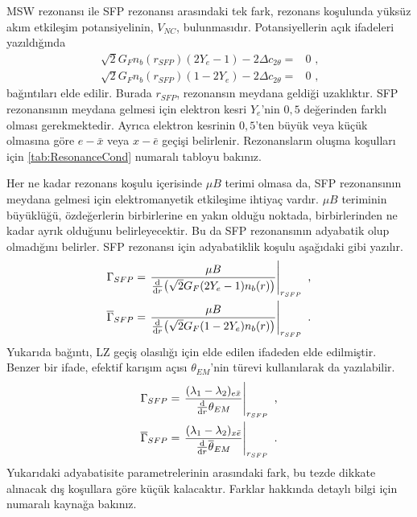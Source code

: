 MSW rezonansı ile SFP rezonansı arasındaki tek fark, rezonans koşulunda yüksüz akım etkileşim potansiyelinin, $ V_{NC} $, bulunmasıdır. Potansiyellerin açık ifadeleri yazıldığında
\begin{align}
	\label{eqn:SFPresonanceConditions_explicit14}\sqrt{2}G_{F}n_{b}(r_{SFP})(2Y_{e}-1) - 2\Delta c_{2\theta} =& 0 \text{ ,} \\
	\label{eqn:SFPresonanceConditions_explicit23}\sqrt{2}G_{F}n_{b}(r_{SFP})(1-2Y_{e}) - 2\Delta c_{2\theta} =& 0 \text{ ,}
\end{align}
bağıntıları elde edilir. Burada $ r_{SFP} $, rezonansın meydana geldiği uzaklıktır. SFP rezonansının meydana gelmesi için elektron kesri $ Y_{e} $'nin $ 0,5 $ değerinden farklı olması gerekmektedir. Ayrıca elektron kesrinin $ 0,5 $'ten büyük veya küçük olmasına göre $ e-\bar{x} $ veya $ x-\bar{e} $ geçişi belirlenir. Rezonansların oluşma koşulları için \ref{tab:ResonanceCond} numaralı tabloyu bakınız.

Her ne kadar rezonans koşulu içerisinde $ \mu B $ terimi olmasa da, SFP rezonansının meydana gelmesi için elektromanyetik etkileşime ihtiyaç vardır.  $ \mu B $ teriminin büyüklüğü, özdeğerlerin birbirlerine en yakın olduğu noktada, birbirlerinden ne kadar ayrık olduğunu belirleyecektir. Bu da SFP rezonansının adyabatik olup olmadığını belirler. SFP rezonansı için adyabatiklik koşulu aşağıdaki gibi yazılır.
\begin{align}
	\Gamma_{SFP} = \eval{\frac{\mu B}{\dv{r}(\sqrt{2}G_{F}(2Y_{e}-1)n_{b}(r))} }_{r_{SFP}} \text{ ,} \\
	\overline{\Gamma}_{SFP} = \eval{\frac{\mu B}{\dv{r}(\sqrt{2}G_{F}(1-2Y_{e})n_{b}(r))} }_{r_{SFP}} \text{ .}
\end{align}
Yukarıda bağıntı, LZ geçiş olasılığı için elde edilen ifadeden elde edilmiştir. Benzer bir ifade, efektif karışım açısı $ \theta_{EM} $'nin türevi kullanılarak da yazılabilir.
\begin{align}\label{eqn:adyabatisiteSFP}
	\Gamma_{SFP} = \eval{\frac{(\lambda_{1}-\lambda_{2})_{e\bar{x}}}{\dv{r}\theta_{EM}}}_{r_{SFP}} \text{ ,} \\
	\overline{\Gamma}_{SFP} = \eval{\frac{(\lambda_{1}-\lambda_{2})_{x\bar{e}}}{\dv{r}\overline{\theta}_{EM}}}_{r_{SFP}} \text{ .}
\end{align}
Yukarıdaki adyabatisite parametrelerinin arasındaki fark, bu tezde dikkate alınacak dış koşullara göre küçük kalacaktır. Farklar hakkında detaylı bilgi için \cite{Friedland:2005xh} numaralı kaynağa bakınız.

